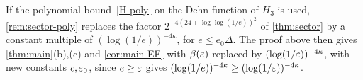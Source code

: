 \begin{remark}\label{game:poly}
If the polynomial bound~\ref{H-poly} on the Dehn function of $H_3$ is used, \cref{rem:sector-poly} replaces the factor
$2^{-4(24+\log\log(1/e))^2}$ of \cref{thm:sector} by a constant multiple of $(\log(1/e))^{-4\kappa}$, for $e\le e_0\Delta$. The proof above
then gives \cref{thm:main}(b),(c) and \cref{cor:main-EF} with $\beta(\varepsilon)$ replaced by $(\log(1/\varepsilon))^{-4\kappa}$, with new constants
$c,\varepsilon_0$, since $e\ge\varepsilon$ gives $(\log(1/e))^{-4\kappa}\ge(\log(1/\varepsilon))^{-4\kappa}$.
\end{remark}
